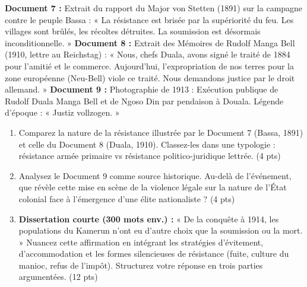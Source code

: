 \documentclass[11pt]{article}
\begin{document}
\begin{exercice}
\textbf{Document 7 :} Extrait du rapport du Major von Stetten (1891) sur la campagne contre le peuple Bassa : « La résistance est brisée par la supériorité du feu. Les villages sont brûlés, les récoltes détruites. La soumission est désormais inconditionnelle. »
\textbf{Document 8 :} Extrait des Mémoires de Rudolf Manga Bell (1910, lettre au Reichstag) : « Nous, chefs Duala, avons signé le traité de 1884 pour l'amitié et le commerce. Aujourd'hui, l'expropriation de nos terres pour la zone européenne (Neu-Bell) viole ce traité. Nous demandons justice par le droit allemand. »
\textbf{Document 9 :} Photographie de 1913 : Exécution publique de Rudolf Duala Manga Bell et de Ngoso Din par pendaison à Douala. Légende d'époque : « Justiz vollzogen. »

\begin{enumerate}
    \item Comparez la nature de la résistance illustrée par le Document 7 (Bassa, 1891) et celle du Document 8 (Duala, 1910). Classez-les dans une typologie : résistance armée primaire vs résistance politico-juridique lettrée. (4 pts)
    \item Analysez le Document 9 comme source historique. Au-delà de l'événement, que révèle cette mise en scène de la violence légale sur la nature de l'État colonial face à l'émergence d'une élite nationaliste ? (4 pts)
    \item \textbf{Dissertation courte (300 mots env.) :} « De la conquête à 1914, les populations du Kamerun n'ont eu d'autre choix que la soumission ou la mort. » Nuancez cette affirmation en intégrant les stratégies d'évitement, d'accommodation et les formes silencieuses de résistance (fuite, culture du manioc, refus de l'impôt). Structurez votre réponse en trois parties argumentées. (12 pts)
\end{enumerate}
\end{exercice}
\end{document}
